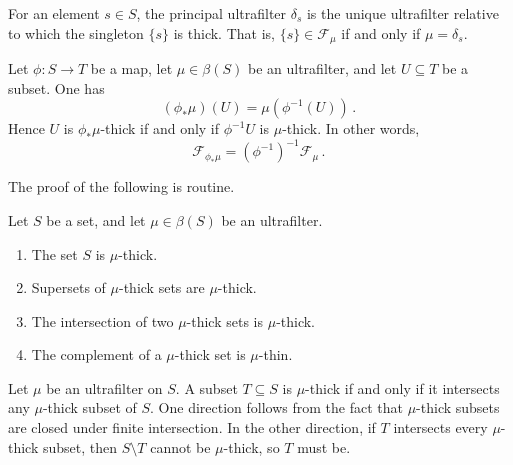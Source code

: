\begin{eg}
	For an element $ s \in S$,
	the principal ultrafilter $ \delta_s $ is
	the unique ultrafilter relative to which
	the singleton $ \{ s \} $ is thick.
	That is, $ \{ s \} \in \mathscr{F}_{\mu} $
	if and only if $ \mu = \delta_s $.
\end{eg}

\begin{eg}
	Let $ \phi \colon S \to T $ be a map,
	let $ \mu \in \beta(S) $ be an ultrafilter, and
	let $ U \subseteq T $ be a subset.
	One has
	\[ (\phi_{\ast} \mu)(U) = \mu (\phi^{-1}(U)) \period \]
	Hence $ U $ is $ \phi_{\ast} \mu $-thick
	if and only if $ \phi^{-1} U $ is $ \mu $-thick.
	In other words,
	\[
		\mathscr{F}_{\phi_{\ast} \mu} =
		(\phi^{-1})^{-1} \mathscr{F}_{\mu} \period
	\]
\end{eg}

The proof of the following is routine.

\begin{lemma}
	Let $ S $ be a set, and
	let $ \mu \in \beta(S) $ be an ultrafilter.
	\begin{enumerate}
		\item The set $ S $ is $ \mu $-thick.
		\item Supersets of $ \mu $-thick sets are $ \mu $-thick.
		\item The intersection of two $ \mu $-thick sets
			is $ \mu $-thick.
		\item The complement of a $ \mu $-thick set
			is $ \mu $-thin.
	\end{enumerate}
\end{lemma}

\begin{eg}%
	\label{eg:thicknesscriterion}
	Let $ \mu $ be an ultrafilter on $ S $.
	A subset $ T \subseteq S $ is $ \mu $-thick if and only if
	it intersects any $ \mu $-thick subset of $ S $.
	One direction follows from the fact that $ \mu $-thick subsets
	are closed under finite intersection.
	In the other direction, if $ T $ intersects
	every $ \mu $-thick subset,
	then $ S \setminus T $ cannot be $ \mu $-thick, so
	$ T $ must be.
\end{eg}

